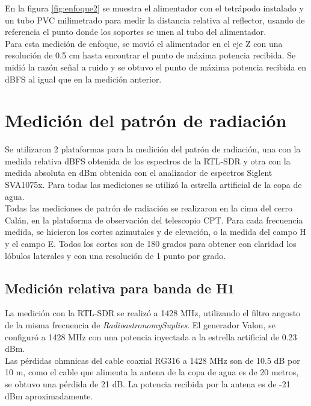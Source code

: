 En la figura \ref{fig:enfoque2} se muestra el alimentador con el tetrápodo instalado y un tubo PVC milimetrado para medir la distancia relativa al reflector, usando de referencia el punto donde los soportes se unen al tubo del alimentador.\\

Para esta medición de enfoque, se movió el alimentador en el eje Z con una resolución de 0.5 cm hasta encontrar el punto de máxima potencia recibida. Se midió la razón señal a ruido y se obtuvo el punto de máxima potencia recibida en dBFS al igual que en la medición anterior.\\

\section{Medición del patrón de radiación}

Se utilizaron 2 plataformas para la medición del patrón de radiación, una con la medida relativa dBFS obtenida de los espectros de la RTL-SDR y otra con la medida absoluta en dBm obtenida con el analizador de espectros Siglent SVA1075x. Para todas las mediciones se utilizó la estrella artificial de la copa de agua.\\

Todas las mediciones de patrón de radiación se realizaron en la cima del cerro Calán, en la plataforma de observación del telescopio CPT. Para cada frecuencia medida, se hicieron los cortes azimutales y de elevación, o la medida del campo H y el campo E. Todos los cortes son de 180 grados para obtener con claridad los lóbulos laterales y con una resolución de 1 punto por grado.\\


\subsection{Medición relativa para banda de H1}

La medición con la RTL-SDR se realizó a 1428 MHz, utilizando el filtro angosto de la misma frecuencia de \textit{RadioastronomySuplies}. El generador Valon, se configuró a 1428 MHz con una potencia inyectada a la estrella artificial de 0.23 dBm.\\

Las pérdidas ohmnicas del cable coaxial RG316 a 1428 MHz son de 10.5 dB por 10 m, como el cable que alimenta la antena de la copa de agua es de 20 metros, se obtuvo una pérdida de 21 dB. La potencia recibida por la antena es de -21 dBm aproximadamente.\\

